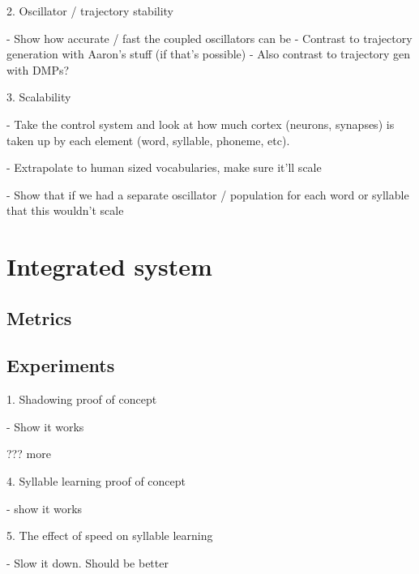 2. Oscillator / trajectory stability

- Show how accurate / fast the coupled oscillators can be
- Contrast to trajectory generation with Aaron's stuff
  (if that's possible)
  - Also contrast to trajectory gen with DMPs?

3. Scalability

- Take the control system and look at how much cortex (neurons, synapses)
  is taken up by each element (word, syllable, phoneme, etc).

- Extrapolate to human sized vocabularies, make sure it'll scale

- Show that if we had a separate oscillator / population
  for each word or syllable that this wouldn't scale

\section{Integrated system}

\subsection{Metrics}

\subsection{Experiments}

1. Shadowing proof of concept

- Show it works

??? more

4. Syllable learning proof of concept

- show it works

5. The effect of speed on syllable learning

- Slow it down. Should be better
